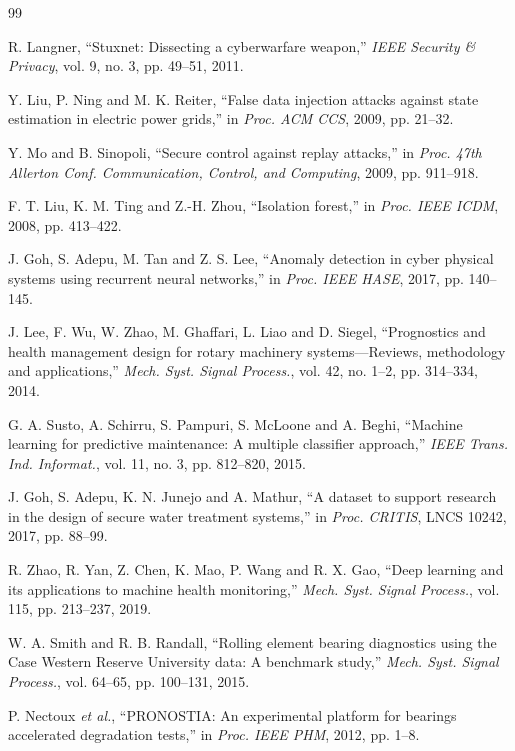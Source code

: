 \documentclass[conference]{IEEEtran}
\begin{document}
\begin{thebibliography}{99}
\footnotesize

 R. Langner, ``Stuxnet: Dissecting a cyberwarfare weapon,'' \emph{IEEE Security \& Privacy}, vol. 9, no. 3, pp. 49--51, 2011.

 Y. Liu, P. Ning and M. K. Reiter, ``False data injection attacks against state estimation in electric power grids,'' in \emph{Proc. ACM CCS}, 2009, pp. 21--32.

 Y. Mo and B. Sinopoli, ``Secure control against replay attacks,'' in \emph{Proc. 47th Allerton Conf. Communication, Control, and Computing}, 2009, pp. 911--918.

 F. T. Liu, K. M. Ting and Z.-H. Zhou, ``Isolation forest,'' in \emph{Proc. IEEE ICDM}, 2008, pp. 413--422.

 J. Goh, S. Adepu, M. Tan and Z. S. Lee, ``Anomaly detection in cyber physical systems using recurrent neural networks,'' in \emph{Proc. IEEE HASE}, 2017, pp. 140--145.

 J. Lee, F. Wu, W. Zhao, M. Ghaffari, L. Liao and D. Siegel, ``Prognostics and health management design for rotary machinery systems---Reviews, methodology and applications,'' \emph{Mech. Syst. Signal Process.}, vol. 42, no. 1--2, pp. 314--334, 2014.

 G. A. Susto, A. Schirru, S. Pampuri, S. McLoone and A. Beghi, ``Machine learning for predictive maintenance: A multiple classifier approach,'' \emph{IEEE Trans. Ind. Informat.}, vol. 11, no. 3, pp. 812--820, 2015.

 J. Goh, S. Adepu, K. N. Junejo and A. Mathur, ``A dataset to support research in the design of secure water treatment systems,'' in \emph{Proc. CRITIS}, LNCS 10242, 2017, pp. 88--99.

 R. Zhao, R. Yan, Z. Chen, K. Mao, P. Wang and R. X. Gao, ``Deep learning and its applications to machine health monitoring,'' \emph{Mech. Syst. Signal Process.}, vol. 115, pp. 213--237, 2019.

 W. A. Smith and R. B. Randall, ``Rolling element bearing diagnostics using the Case Western Reserve University data: A benchmark study,'' \emph{Mech. Syst. Signal Process.}, vol. 64--65, pp. 100--131, 2015.

 P. Nectoux \emph{et al.}, ``PRONOSTIA: An experimental platform for bearings accelerated degradation tests,'' in \emph{Proc. IEEE PHM}, 2012, pp. 1--8.


\end{thebibliography}
\end{document}
